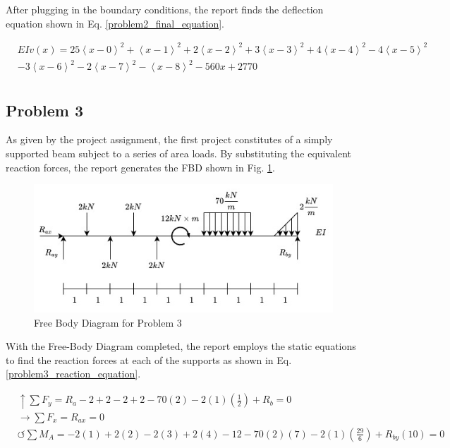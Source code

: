 \documentclass[a4paper]{article}
\begin{document}
After plugging in the boundary conditions, the report finds the deflection equation shown in Eq. \ref{problem2_final_equation}.

\begin{equation}
\begin{split}
  & EI v(x) = 25\left<x-0\right>^2 + \left<x-1\right>^2 + 2\left<x-2\right>^2 + 3\left<x-3\right>^2 + 4\left<x-4\right>^2  -  4\left<x-5\right>^2 \\
& - 3\left<x-6\right>^2  -  2\left<x-7\right>^2 - \left<x-8\right>^2 - 560 x + 2770 \\
\end{split}
\label{problem2_final_equation}
\end{equation}



\subsection{Problem 3}

As given by the project assignment, the first project constitutes of a simply supported beam subject to a series of area loads. By substituting the equivalent reaction forces, the report generates the FBD shown in Fig. \ref{FBD_3}.

\begin{figure}[h]
\includegraphics[width=\textwidth]{FBD/FBD_3.jpg}
\caption{Free Body Diagram for Problem 3}
\label{FBD_3}
\end{figure}

With the Free-Body Diagram completed, the report employs the static equations to find the reaction forces at each of the supports as shown in Eq. \ref{problem3_reaction_equation}.

\begin{equation}
\begin{split}
	&\uparrow \sum F_y = R_a - 2 + 2 - 2 + 2 - 70(2) - 2(1)\left(\frac{1}{2}\right) + R_b = 0 \\
 	&\rightarrow \sum F_x = R_{ax} = 0 \\
 	&\circlearrowleft \sum M_A = -2(1) + 2(2) - 2(3) + 2(4) - 12 - 70(2)(7) - 2(1)\left(\frac{29}{6}\right) + R_{by}(10) = 0 \\
\end{split}
\label{problem3_reaction_equation}
\end{equation}
\end{document}
